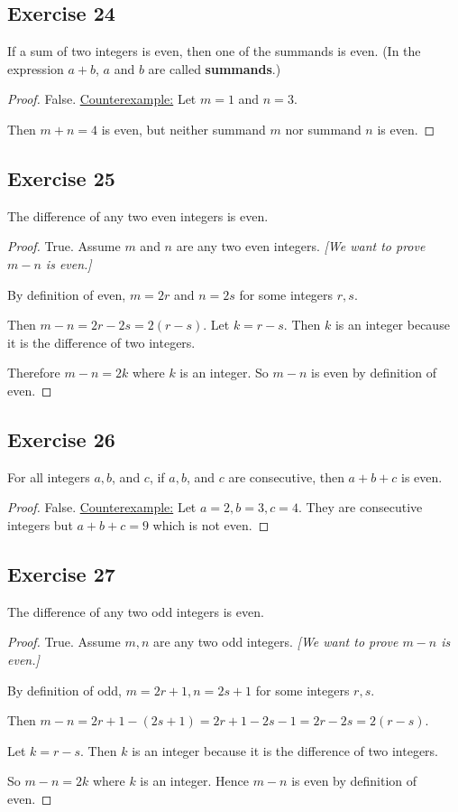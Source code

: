 \documentclass[14pt]{extarticle}
\begin{document}
\subsection{Exercise 24}
If a sum of two integers is even, then one of the summands is even. (In the expression $a + b$, $a$ and $b$ are called {\bf summands}.)

\begin{proof}
False. \underline{Counterexample:} Let $m = 1$ and $n = 3$. 

Then $m + n = 4$ is even, but neither summand $m$ nor summand $n$ is even.
\end{proof}

\subsection{Exercise 25}
The difference of any two even integers is even.

\begin{proof}
True. Assume $m$ and $n$ are any two even integers. {\it [We want to prove $m-n$ is even.]}

By definition of even, $m = 2r$ and $n = 2s$ for some integers $r, s$.

Then $m - n = 2r - 2s = 2(r-s)$. Let $k = r-s$. Then $k$ is an integer because it is the difference of two integers.

Therefore $m - n = 2k$ where $k$ is an integer. So $m-n$ is even by definition of even.
\end{proof}

\subsection{Exercise 26}
For all integers $a, b$, and $c$, if $a, b$, and $c$ are consecutive, then $a + b + c$ is even.

\begin{proof}
False. \underline{Counterexample:} Let $a = 2, b = 3, c = 4$. They are consecutive integers but $a+b+c = 9$ which is not even.
\end{proof}

\subsection{Exercise 27}
The difference of any two odd integers is even.

\begin{proof}
True. Assume $m, n$ are any two odd integers. {\it [We want to prove $m - n$ is even.]}

By definition of odd, $m = 2r+1, n = 2s+1$ for some integers $r,s$.

Then $m-n = 2r+1 - (2s+1) = 2r+1 - 2s - 1 = 2r - 2s = 2(r-s)$.

Let $k = r-s$. Then $k$ is an integer because it is the difference of two integers.

So $m-n = 2k$ where $k$ is an integer. Hence $m-n$ is even by definition of even.
\end{proof}
\end{document}
